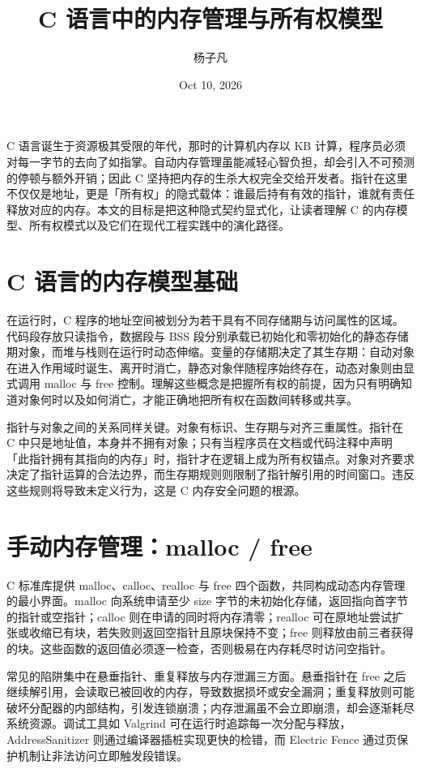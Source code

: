 \title{C 语言中的内存管理与所有权模型}
\author{杨子凡}
\date{Oct 10, 2026}
\maketitle
C 语言诞生于资源极其受限的年代，那时的计算机内存以 KB 计算，程序员必须对每一字节的去向了如指掌。自动内存管理虽能减轻心智负担，却会引入不可预测的停顿与额外开销；因此 C 坚持把内存的生杀大权完全交给开发者。指针在这里不仅仅是地址，更是「所有权」的隐式载体：谁最后持有有效的指针，谁就有责任释放对应的内存。本文的目标是把这种隐式契约显式化，让读者理解 C 的内存模型、所有权模式以及它们在现代工程实践中的演化路径。\par
\chapter{C 语言的内存模型基础}
在运行时，C 程序的地址空间被划分为若干具有不同存储期与访问属性的区域。代码段存放只读指令，数据段与 BSS 段分别承载已初始化和零初始化的静态存储期对象，而堆与栈则在运行时动态伸缩。变量的存储期决定了其生存期：自动对象在进入作用域时诞生、离开时消亡，静态对象伴随程序始终存在，动态对象则由显式调用 malloc 与 free 控制。理解这些概念是把握所有权的前提，因为只有明确知道对象何时以及如何消亡，才能正确地把所有权在函数间转移或共享。\par
指针与对象之间的关系同样关键。对象有标识、生存期与对齐三重属性。指针在 C 中只是地址值，本身并不拥有对象；只有当程序员在文档或代码注释中声明「此指针拥有其指向的内存」时，指针才在逻辑上成为所有权锚点。对象对齐要求决定了指针运算的合法边界，而生存期规则则限制了指针解引用的时间窗口。违反这些规则将导致未定义行为，这是 C 内存安全问题的根源。\par
\chapter{手动内存管理：malloc / free}
C 标准库提供 malloc、calloc、realloc 与 free 四个函数，共同构成动态内存管理的最小界面。malloc 向系统申请至少 size 字节的未初始化存储，返回指向首字节的指针或空指针；calloc 则在申请的同时将内存清零；realloc 可在原地址尝试扩张或收缩已有块，若失败则返回空指针且原块保持不变；free 则释放由前三者获得的块。这些函数的返回值必须逐一检查，否则极易在内存耗尽时访问空指针。\par
常见的陷阱集中在悬垂指针、重复释放与内存泄漏三方面。悬垂指针在 free 之后继续解引用，会读取已被回收的内存，导致数据损坏或安全漏洞；重复释放则可能破坏分配器的内部结构，引发连锁崩溃；内存泄漏虽不会立即崩溃，却会逐渐耗尽系统资源。调试工具如 Valgrind 可在运行时追踪每一次分配与释放，AddressSanitizer 则通过编译器插桩实现更快的检错，而 Electric Fence 通过页保护机制让非法访问立即触发段错误。\par

